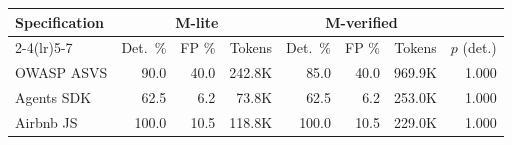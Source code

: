 \begin{tabular}{lrrrrrrr}
\toprule
Specification & \multicolumn{3}{c}{M-lite} & \multicolumn{3}{c}{M-verified} & \\
\cmidrule(lr){2-4}\cmidrule(lr){5-7}
 & Det.\ \% & FP \% & Tokens & Det.\ \% & FP \% & Tokens & $p$ (det.) \\
\midrule
OWASP ASVS & 90.0 & 40.0 & 242.8K & 85.0 & 40.0 & 969.9K & 1.000 \\
Agents SDK & 62.5 & 6.2 & 73.8K & 62.5 & 6.2 & 253.0K & 1.000 \\
Airbnb JS & 100.0 & 10.5 & 118.8K & 100.0 & 10.5 & 229.0K & 1.000 \\
\bottomrule
\end{tabular}
